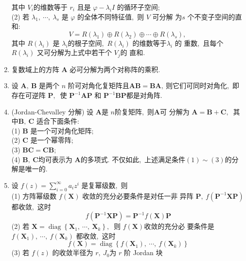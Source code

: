 \begin{enumerate}
		其中  $V_{i}  $的维数等于 $ r_{i}$  且是  $\varphi-\lambda_{i} I $ 的循环子空间;\\
		(2) 若  $\lambda_{1},\  \cdots,\  \lambda_{s} $ 是  $\varphi $ 的全体不同特征值,\  则  $V$  可分解 为$  s$  个不变子空间的直和:
		$$V=R\left(\lambda_{1}\right) \oplus R\left(\lambda_{2}\right) \oplus \cdots \oplus R\left(\lambda_{s}\right),\ $$
		其中  $R\left(\lambda_{i}\right)$  是  $\lambda_{i}  $的根子空间,\   $R\left(\lambda_{i}\right)$  的维数等于$  \lambda_{i}$ 的 重数,\  且每个  $R\left(\lambda_{i}\right)$  又可分解为上式中若干个  $V_{j}  $的 直和.
		\item 复数域上的方阵 $ \boldsymbol{A} $ 必可分解为两个对称阵的乘积.
		\item 设  $\boldsymbol{A},\  \boldsymbol{B} $ 是两个  $n $ 阶可对角化复矩阵且$  \boldsymbol{A B}=\boldsymbol{B A} ,\  $则它们可同时对角化,\  即存在可逆阵  $\boldsymbol{P} ,\ $ 使 $ \boldsymbol{P}^{-1} \boldsymbol{A} \boldsymbol{P} $ 和  $\boldsymbol{P}^{-1} \boldsymbol{B P}  $都是对角阵.
		\item (Jordan-Chevalley 分解) 设  $\boldsymbol{A}  $是  $n  $阶复矩阵,\  则$  \boldsymbol{A}  $可 分解为  $\boldsymbol{A}=\boldsymbol{B}+\boldsymbol{C} ,\ $ 其中$ \boldsymbol{B},\  \boldsymbol{C} $ 适合下面条件:\\
		(1) $ \boldsymbol{B}$  是一个可对角化矩阵;\\
		(2)  $\boldsymbol{C}$  是一个幂零阵;\\
		(3)  $\boldsymbol{B C}=\boldsymbol{C B} $;\\
		(4) $ \boldsymbol{B},\  \boldsymbol{C}  $均可表示为  $\boldsymbol{A}  $的多项式.
		不仅如此,\  上述满足条件$  (1) \sim(3)  $的分解是唯一的.
		\item 设  $f(z)=\sum_{i=0}^{\infty} a_{i} z^{i} $ 是复幂级数,\  则\\
		(1) 方阵幂级数  $f(\boldsymbol{X}) $ 收敛的充分必要条件是对任一非 异阵  $\boldsymbol{P},\  f\left(\boldsymbol{P}^{-1} \boldsymbol{X} \boldsymbol{P}\right)$  都收敛,\  这时
		$$f\left(\boldsymbol{P}^{-1} \boldsymbol{X} \boldsymbol{P}\right)=\boldsymbol{P}^{-1} f(\boldsymbol{X}) \boldsymbol{P}$$
		(2) 若  $\boldsymbol{X}=\operatorname{diag}\left\{\boldsymbol{X}_{1},\  \cdots,\  \boldsymbol{X}_{k}\right\} ,\ $ 则  $f(\boldsymbol{X})  $收敛的充分必 要条件是$  f\left(\boldsymbol{X}_{1}\right),\  \cdots,\  f\left(\boldsymbol{X}_{k}\right) $ 都收敛,\  这时
		$$f(\boldsymbol{X})=\operatorname{diag}\left\{f\left(\boldsymbol{X}_{1}\right),\  \cdots,\  f\left(\boldsymbol{X}_{k}\right)\right\}$$
		(3) 若 $ f(z) $ 的收敛半径为  $r,\  J_{0}  $为 $ r $ 阶 Jordan 块

\end{enumerate}
